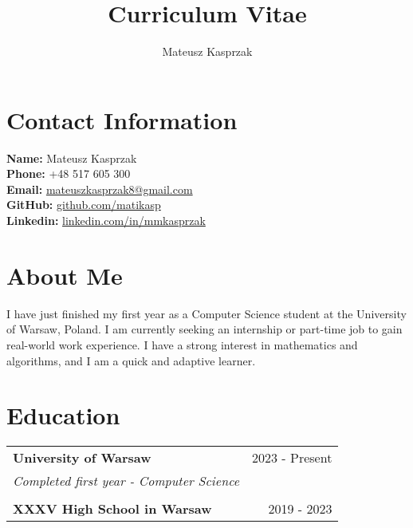 \documentclass[a4paper,10pt]{article}
\begin{document}
\title{\vspace{-3cm}Curriculum Vitae}
\author{Mateusz Kasprzak}
\date{}

\maketitle

\section*{Contact Information}
\begin{tabbing}
\textbf{Name:} \hspace{2.1cm} Mateusz Kasprzak \\
\textbf{Phone:} \hspace{2.0cm} +48 517 605 300 \\
\textbf{Email:} \hspace{2.1cm} \href{mailto:mateuszkasprzak8@gmail.com}{mateuszkasprzak8@gmail.com} \\
\textbf{GitHub:} \hspace{1.8cm} \href{https://github.com/matikasp}{github.com/matikasp} \\
\textbf{Linkedin:} \hspace{1.6cm} \href{https://linkedin.com/in/mmkasprzak}{linkedin.com/in/mmkasprzak}
\end{tabbing}

\section*{About Me}
I have just finished my first year as a Computer Science student at the University of Warsaw, Poland. I am currently seeking an internship or part-time job to gain real-world work experience. I have a strong interest in mathematics and algorithms, and I am a quick and adaptive learner.

\section*{Education}
\begin{tabularx}{\textwidth}{Xr}
\textbf{University of Warsaw} & 2023 - Present \\
\emph{Completed first year - Computer Science} & \\
\\
\textbf{XXXV High School in Warsaw} & 2019 - 2023 \\
\end{tabularx}
\end{document}
